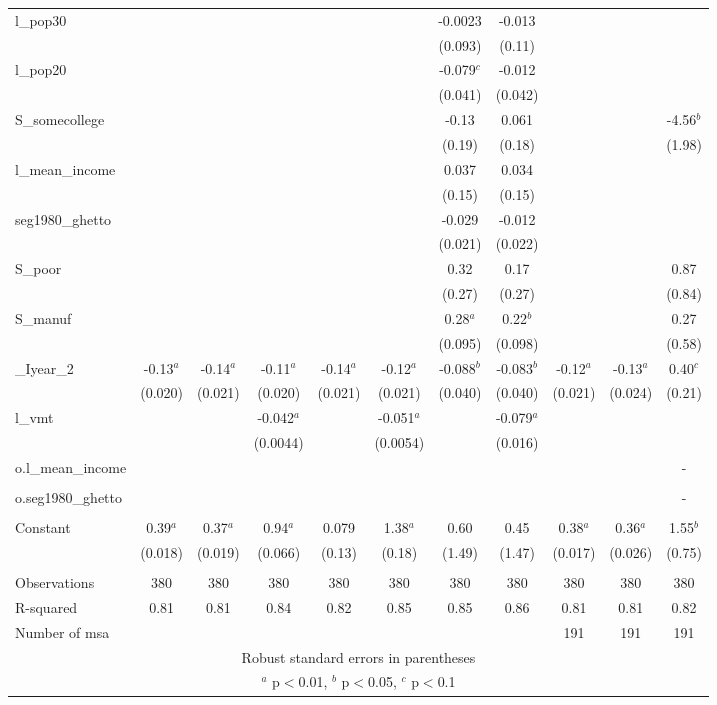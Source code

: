 \documentclass[]{article}
\begin{document}
\begin{tabular}{lcccccccccc}
l\_pop30 &  &  &  &  &  & -0.0023 & -0.013 &  &  &  \\
 &  &  &  &  &  & (0.093) & (0.11) &  &  &  \\
l\_pop20 &  &  &  &  &  & -0.079$^c$ & -0.012 &  &  &  \\
 &  &  &  &  &  & (0.041) & (0.042) &  &  &  \\
S\_somecollege &  &  &  &  &  & -0.13 & 0.061 &  &  & -4.56$^b$ \\
 &  &  &  &  &  & (0.19) & (0.18) &  &  & (1.98) \\
l\_mean\_income &  &  &  &  &  & 0.037 & 0.034 &  &  &  \\
 &  &  &  &  &  & (0.15) & (0.15) &  &  &  \\
seg1980\_ghetto &  &  &  &  &  & -0.029 & -0.012 &  &  &  \\
 &  &  &  &  &  & (0.021) & (0.022) &  &  &  \\
S\_poor &  &  &  &  &  & 0.32 & 0.17 &  &  & 0.87 \\
 &  &  &  &  &  & (0.27) & (0.27) &  &  & (0.84) \\
S\_manuf &  &  &  &  &  & 0.28$^a$ & 0.22$^b$ &  &  & 0.27 \\
 &  &  &  &  &  & (0.095) & (0.098) &  &  & (0.58) \\
\_Iyear\_2 & -0.13$^a$ & -0.14$^a$ & -0.11$^a$ & -0.14$^a$ & -0.12$^a$ & -0.088$^b$ & -0.083$^b$ & -0.12$^a$ & -0.13$^a$ & 0.40$^c$ \\
 & (0.020) & (0.021) & (0.020) & (0.021) & (0.021) & (0.040) & (0.040) & (0.021) & (0.024) & (0.21) \\
l\_vmt &  &  & -0.042$^a$ &  & -0.051$^a$ &  & -0.079$^a$ &  &  &  \\
 &  &  & (0.0044) &  & (0.0054) &  & (0.016) &  &  &  \\
o.l\_mean\_income &  &  &  &  &  &  &  &  &  & - \\
 &  &  &  &  &  &  &  &  &  &  \\
o.seg1980\_ghetto &  &  &  &  &  &  &  &  &  & - \\
 &  &  &  &  &  &  &  &  &  &  \\
Constant & 0.39$^a$ & 0.37$^a$ & 0.94$^a$ & 0.079 & 1.38$^a$ & 0.60 & 0.45 & 0.38$^a$ & 0.36$^a$ & 1.55$^b$ \\
 & (0.018) & (0.019) & (0.066) & (0.13) & (0.18) & (1.49) & (1.47) & (0.017) & (0.026) & (0.75) \\
 &  &  &  &  &  &  &  &  &  &  \\
Observations & 380 & 380 & 380 & 380 & 380 & 380 & 380 & 380 & 380 & 380 \\
R-squared & 0.81 & 0.81 & 0.84 & 0.82 & 0.85 & 0.85 & 0.86 & 0.81 & 0.81 & 0.82 \\
 Number of msa &  &  &  &  &  &  &  & 191 & 191 & 191 \\ \hline
\multicolumn{11}{c}{ Robust standard errors in parentheses} \\
\multicolumn{11}{c}{ $^a$ p$<$0.01, $^b$ p$<$0.05, $^c$ p$<$0.1} \\
\end{tabular}
\end{document}
